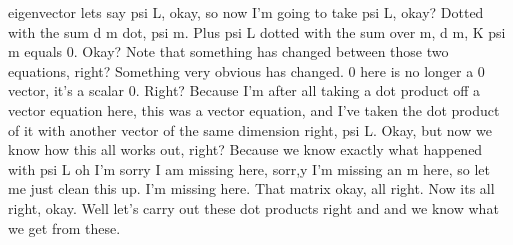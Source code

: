 \documentclass[10pt]{article}
\begin{document}
eigenvector lets say psi L, okay, so now I'm going to take psi L, okay? Dotted with the sum d m dot, psi m. Plus psi L dotted with the sum over m, d m, K psi m equals 0. Okay? Note that something has changed between those two equations, right? Something very obvious has changed. 0 here is no longer a 0 vector, it's a scalar 0. Right? Because I'm after all taking a dot product off a vector equation here, this was a vector equation, and I've taken the dot product of it with another vector of the same dimension right, psi L. Okay, but now we know how this all works out, right? Because we know exactly what happened with psi L oh I'm sorry I am missing here, sorr,y I'm missing an m here, so let me just clean this up. I'm missing here. That matrix okay, all right. Now its all right, okay. Well let's carry out these dot products right and and we know what we get from these.
\end{document}
